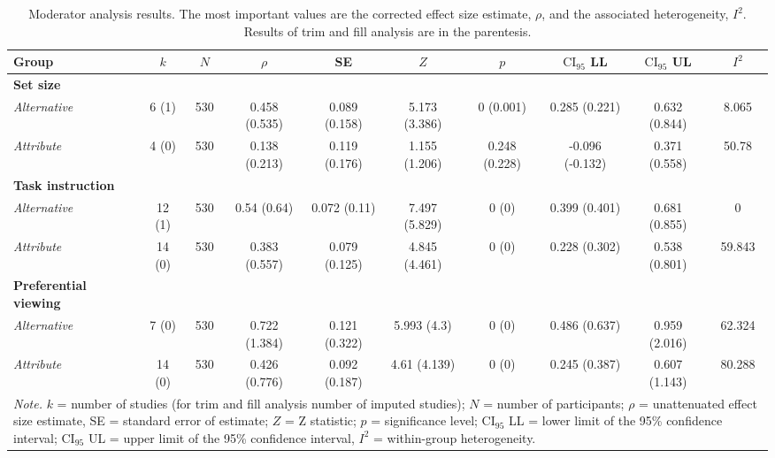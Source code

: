 \begin{table}[ht]
\centering
\caption{Moderator analysis results. The most important values are the corrected effect size estimate, $\rho$, and the associated heterogeneity, $I^2$. Results of trim and fill analysis are in the parentesis.} 
\label{tab:mod_results}
\begin{tabular}{lccccccccc}
  \hline
Group & $k$ & $N$ & $\rho$ & SE & $Z$ & $p$ & $\textrm{CI}_{95}$ LL & $\textrm{CI}_{95}$ UL & $I^2$ \\ 
  \hline
\textbf{Set size} &  &  &  &  &  &  &  &  &  \\ 
  \hspace{2mm}\textit{Alternative} & 6 (1) & 530 & 0.458 (0.535) & 0.089 (0.158) & 5.173 (3.386) & 0 (0.001) & 0.285 (0.221) & 0.632 (0.844) & 8.065 \\ 
  \hspace{2mm}\textit{Attribute} & 4 (0) & 530 & 0.138 (0.213) & 0.119 (0.176) & 1.155 (1.206) & 0.248 (0.228) & -0.096 (-0.132) & 0.371 (0.558) & 50.78 \\ 
  \textbf{Task instruction} &  &  &  &  &  &  &  &  &  \\ 
  \hspace{2mm}\textit{Alternative} & 12 (1) & 530 & 0.54 (0.64) & 0.072 (0.11) & 7.497 (5.829) & 0 (0) & 0.399 (0.401) & 0.681 (0.855) & 0 \\ 
  \hspace{2mm}\textit{Attribute} & 14 (0) & 530 & 0.383 (0.557) & 0.079 (0.125) & 4.845 (4.461) & 0 (0) & 0.228 (0.302) & 0.538 (0.801) & 59.843 \\ 
  \textbf{Preferential viewing} &  &  &  &  &  &  &  &  &  \\ 
  \hspace{2mm}\textit{Alternative} & 7 (0) & 530 & 0.722 (1.384) & 0.121 (0.322) & 5.993 (4.3) & 0 (0) & 0.486 (0.637) & 0.959 (2.016) & 62.324 \\ 
  \hspace{2mm}\textit{Attribute} & 14 (0) & 530 & 0.426 (0.776) & 0.092 (0.187) & 4.61 (4.139) & 0 (0) & 0.245 (0.387) & 0.607 (1.143) & 80.288 \\ 
   \hline 
 \multicolumn{10}{p{0.9\textwidth}}{\scriptsize{\textit{Note.} $k$ = number of studies (for trim and fill analysis number of imputed studies); $N$ = number of participants; $\rho$ = unattenuated effect size estimate, SE = standard error of estimate; $Z$ = Z statistic; $p$ = significance level; $\textrm{CI}_{95}$ LL = lower limit of the 95\% confidence interval; $\textrm{CI}_{95}$ UL = upper limit of the 95\% confidence interval, $I^2$ = within-group heterogeneity.}} 
\end{tabular}
\end{table}
